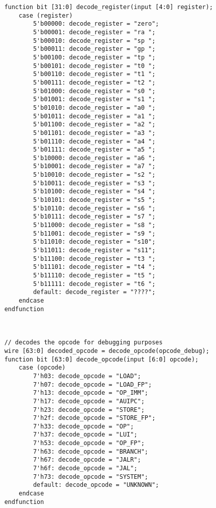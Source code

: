 \begin{lstlisting}
    function bit [31:0] decode_register(input [4:0] register);
        case (register)
            5'b00000: decode_register = "zero";
            5'b00001: decode_register = "ra ";
            5'b00010: decode_register = "sp ";
            5'b00011: decode_register = "gp ";
            5'b00100: decode_register = "tp ";
            5'b00101: decode_register = "t0 ";
            5'b00110: decode_register = "t1 ";
            5'b00111: decode_register = "t2 ";
            5'b01000: decode_register = "s0 ";
            5'b01001: decode_register = "s1 ";
            5'b01010: decode_register = "a0 ";
            5'b01011: decode_register = "a1 ";
            5'b01100: decode_register = "a2 ";
            5'b01101: decode_register = "a3 ";
            5'b01110: decode_register = "a4 ";
            5'b01111: decode_register = "a5 ";
            5'b10000: decode_register = "a6 ";
            5'b10001: decode_register = "a7 ";
            5'b10010: decode_register = "s2 ";
            5'b10011: decode_register = "s3 ";
            5'b10100: decode_register = "s4 ";
            5'b10101: decode_register = "s5 ";
            5'b10110: decode_register = "s6 ";
            5'b10111: decode_register = "s7 ";
            5'b11000: decode_register = "s8 ";
            5'b11001: decode_register = "s9 ";
            5'b11010: decode_register = "s10";
            5'b11011: decode_register = "s11";
            5'b11100: decode_register = "t3 ";
            5'b11101: decode_register = "t4 ";
            5'b11110: decode_register = "t5 ";
            5'b11111: decode_register = "t6 ";
            default: decode_register = "????";
        endcase        
    endfunction



    // decodes the opcode for debugging purposes
    wire [63:0] decoded_opcode = decode_opcode(opcode_debug);
    function bit [63:0] decode_opcode(input [6:0] opcode);
        case (opcode)
            7'h03: decode_opcode = "LOAD";
            7'h07: decode_opcode = "LOAD_FP";
            7'h13: decode_opcode = "OP_IMM";
            7'h17: decode_opcode = "AUIPC";
            7'h23: decode_opcode = "STORE";
            7'h2f: decode_opcode = "STORE_FP";
            7'h33: decode_opcode = "OP";
            7'h37: decode_opcode = "LUI";
            7'h53: decode_opcode = "OP_FP";
            7'h63: decode_opcode = "BRANCH";
            7'h67: decode_opcode = "JALR";
            7'h6f: decode_opcode = "JAL";
            7'h73: decode_opcode = "SYSTEM";
            default: decode_opcode = "UNKNOWN";
        endcase
    endfunction


\end{lstlisting}

